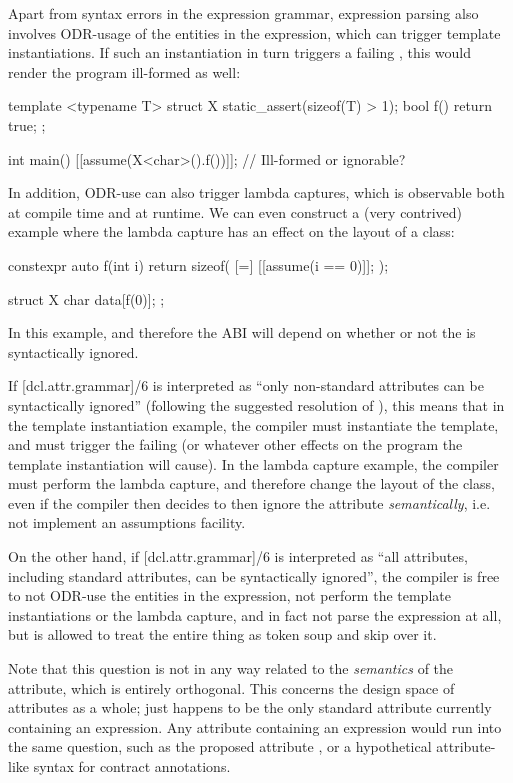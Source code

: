  Apart from syntax errors in the expression grammar, expression parsing also involves ODR-usage of the entities in the expression, which can trigger template instantiations. If such an instantiation in turn triggers a failing , this would render the program ill-formed as well:
 
\begin{codeblock}
template <typename T>
struct X {
  static_assert(sizeof(T) > 1);
  bool f() { return true; }
};

int main() {
  [[assume(X<char>().f())]];  // Ill-formed or ignorable?
}
\end{codeblock}

In addition, ODR-use can also trigger lambda captures, which is observable both at compile time and at runtime. We can even construct a (very contrived) example where the lambda capture has an effect on the layout of a class:

\begin{codeblock}
constexpr auto f(int i) {
  return sizeof( [=] { [[assume(i == 0)]]; } );
}

struct X {
  char data[f(0)];
};
\end{codeblock}

In this example,  and therefore the ABI will depend on whether or not the  is syntactically ignored.

If [dcl.attr.grammar]/6 is interpreted as ``only non-standard attributes can be syntactically ignored'' (following the suggested resolution of \cite{CWG2538}), this means that in the template instantiation example, the compiler must instantiate the template, and must trigger the failing  (or whatever other effects on the program the template instantiation will cause). In the lambda capture example, the compiler must perform the lambda capture, and therefore change the layout of the class, even if the compiler then decides to then ignore the attribute \emph{semantically}, i.e. not implement an assumptions facility.

On the other hand, if [dcl.attr.grammar]/6 is interpreted as ``all attributes, including standard attributes, can be syntactically ignored'', the compiler is free to not ODR-use the entities in the expression, not perform the template instantiations or the lambda capture, and in fact not parse the expression at all, but is allowed to treat the entire thing as token soup and skip over it.

Note that this question is not in any way related to the \emph{semantics} of the  attribute, which is entirely orthogonal. This concerns the design space of attributes as a whole;  just happens to be the only standard attribute currently containing an expression. Any attribute containing an expression would run into the same question, such as the proposed  attribute \cite{P1144R5}, or a hypothetical attribute-like syntax for contract annotations.

